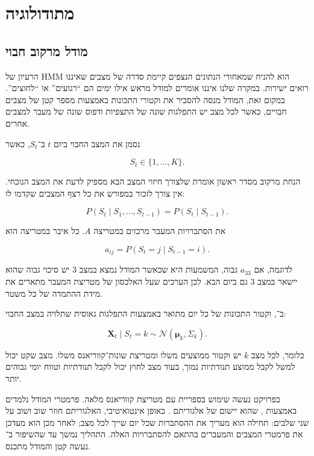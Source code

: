 \section{מתודולוגיה}

\subsection{מודל מרקוב חבוי}

הרעיון של HMM הוא להניח שמאחורי הנתונים הנצפים קיימת סדרה של מצבים שאיננו רואים ישירות. במקרה שלנו איננו אומרים למודל מראש אילו ימים הם ``רגועים'' או ``לחוצים''. במקום זאת, המודל מנסה להסביר את וקטורי התכונות באמצעות מספר קטן של מצבים חבויים, כאשר לכל מצב יש התפלגות שונה של התצפיות ודפוס שונה של מעבר למצבים אחרים.

נסמן את המצב החבוי ביום \(t\) ב־\(S_t\), כאשר

\begin{equation}
S_t\in\{1,\ldots,K\}.
\end{equation}

הנחת מרקוב מסדר ראשון אומרת שלצורך חיזוי המצב הבא מספיק לדעת את המצב הנוכחי. אין צורך לזכור במפורש את כל רצף המצבים שקדמו לו:

\begin{equation}
P(S_t\mid S_1,\ldots,S_{t-1}) = P(S_t\mid S_{t-1}).
\end{equation}

את הסתברויות המעבר מרכזים במטריצה \(A\). כל איבר במטריצה הוא

\begin{equation}
a_{ij}=P(S_t=j\mid S_{t-1}=i).
\end{equation}

לדוגמה, אם \(a_{33}\) גבוה, המשמעות היא שכאשר המודל נמצא במצב 3 יש סיכוי גבוה שהוא יישאר במצב 3 גם ביום הבא. לכן הערכים שעל האלכסון של מטריצת המעבר מתארים את מידת ההתמדה של כל משטר.

ב־, וקטור התכונות של כל יום מתואר באמצעות התפלגות גאוסית שתלויה במצב החבוי:

\begin{equation}
\mathbf{X}_t\mid S_t=k \sim \mathcal{N}(\boldsymbol{\mu}_k,\Sigma_k).
\end{equation}

כלומר, לכל מצב \(k\) יש וקטור ממוצעים משלו ומטריצת שונות־קווריאנס משלו. מצב שקט יכול למשל לקבל ממוצע תנודתיות נמוך, בעוד מצב לחוץ יכול לקבל תנודתיות וטווח יומי גבוהים יותר.

בפרויקט נעשה שימוש בספריית  \cite{hmmlearn} עם מטריצת קווריאנס מלאה. פרמטרי המודל נלמדים באמצעות , שהוא יישום של אלגוריתם  \cite{baum1970maximization}. באופן אינטואיטיבי, האלגוריתם חוזר שוב ושוב על שני שלבים: תחילה הוא מעריך את ההסתברות שכל יום שייך לכל מצב; לאחר מכן הוא מעדכן את פרמטרי המצבים והמעברים בהתאם להסתברויות האלה. התהליך נמשך עד שהשיפור ב־ נעשה קטן והמודל מתכנס.

